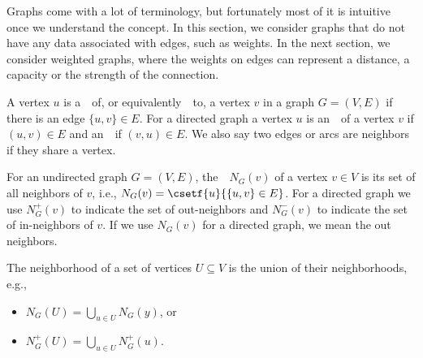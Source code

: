 \begin{cluster}
\label{grp:grm:bg::graphs::graphs}

\begin{gram}
\label{grm:bg::graphs::graphs}
Graphs come with a lot of terminology, but fortunately most of it is
intuitive once we understand the concept.  
In this section, we consider graphs that do not have any data
associated with edges, such as weights.
In the next section, we consider weighted graphs, where the weights on
edges can represent a distance, a capacity or the strength of the
connection.

\end{gram}
\end{cluster}

\begin{cluster}
\label{grp:def:bg::graphs::neighbors}

\begin{definition}[Neighbors]
\label{def:bg::graphs::neighbors}
 A vertex $u$ is a~~of, or
 equivalently~~to, a vertex $v$ in a graph $G = (V,E)$
 if there is an edge $\{u,v\} \in E$.  For a directed graph a vertex
 $u$ is an~~of a vertex $v$ if $(u,v) \in E$ and
 an~~if $(v,u) \in E$.  We also say two edges or
 arcs are neighbors if they share a vertex.

\end{definition}
\end{cluster}

\begin{cluster}
\label{grp:def:bg::graphs::neighborhood}

\begin{definition}[Neighborhood]
\label{def:bg::graphs::neighborhood}
For an undirected graph $G = (V,E)$, the~~$N_G(v)$ 
of a vertex $v \in V$ is its set of all neighbors of $v$, i.e.,
$N_G(v) = \csetf{u}{\{u,v\} \in E}$. 
For a directed graph we use $N_G^+(v)$ to indicate the set of 
out-neighbors and $N_G^-(v)$ to indicate the set of in-neighbors of
$v$.  If we use $N_G(v)$ for a directed graph, we mean the out 
neighbors.  

The neighborhood of a set of vertices $U \subseteq V$ is the union of
their neighborhoods, e.g.,

\begin{itemize}
\item  $N_G(U) = \bigcup_{u \in U} N_G(y)$, or
\item $N_G^+(U) = \bigcup_{u \in U} N_G^+(u)$.
\end{itemize}

\end{definition}
\end{cluster}

